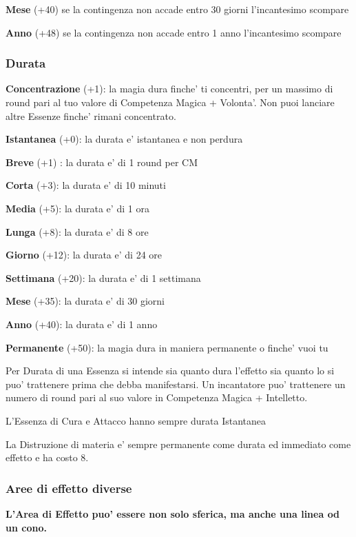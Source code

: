 \documentclass[a4paper,11pt,twoside,openany]{book}
\begin{document}
\textbf{Mese} (+40) se la contingenza non accade entro 30 giorni l'incantesimo scompare

\textbf{Anno} (+48) se la contingenza non accade entro 1 anno l'incantesimo scompare

\subsubsection{Durata}

\label{durata}

\textbf{Concentrazione} (+1): la magia dura finche' ti concentri, per un massimo di round pari al tuo valore di Competenza Magica + Volonta'. Non puoi lanciare altre Essenze finche' rimani concentrato.

\textbf{Istantanea} (+0): la durata e' istantanea e non perdura

\textbf{Breve} (+1) : la durata e' di 1 round per CM

\textbf{Corta} (+3): la durata e' di 10 minuti

\textbf{Media} (+5): la durata e' di 1 ora

\textbf{Lunga} (+8): la durata e' di 8 ore

\textbf{Giorno} (+12): la durata e' di 24 ore

\textbf{Settimana} (+20): la durata e' di 1 settimana

\textbf{Mese} (+35): la durata e' di 30 giorni

\textbf{Anno} (+40): la durata e' di 1 anno

\textbf{Permanente} (+50): la magia dura in maniera permanente o finche' vuoi tu

Per Durata di una Essenza si intende sia quanto dura l'effetto sia quanto lo si puo' trattenere prima che debba manifestarsi. Un incantatore puo' trattenere un numero di round pari al suo valore in Competenza Magica + Intelletto.

L'Essenza di Cura e Attacco hanno sempre durata Istantanea

La Distruzione di materia e' sempre permanente come durata ed immediato come effetto e ha costo 8.

\subsubsection{Aree di effetto diverse}

\label{aree-di-effetto-diverse}

\textbf{L'Area di Effetto puo' essere non solo sferica, ma anche una linea od un cono.}
\end{document}
